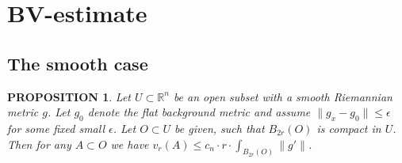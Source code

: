 \documentclass[12pt,leqno,intlimits]{amsart}
\numberwithin{equation}{section}
\newtheorem{prop}[thm]{PROPOSITION}
\theoremstyle{definition}
\newtheorem{defn}[thm]{Definition}%
\theoremstyle{remark}
\newcommand{\R}{\mathbb{R}}
\def\:{\colon}
\begin{document}






\section{BV-estimate}\label{sec-BV-estimate}
\subsection{The smooth case}

\begin{prop}\label{prop-smooth}
Let $U\subset \R^n$ be an open subset with a smooth Riemannian
metric $g$. Let $g_0$ denote the flat background metric and assume $\|g_x-g_0\| \leq \epsilon$ for some fixed small
$\epsilon$.   Let $O\subset U$ be given, such that $B_{2r} (O)$ is compact in $U$.
Then for any $A\subset O$ we have $v_r (A) \leq c_n \cdot r \cdot \int _{B_{2r} ( O)} \|g'\|$.
\end{prop}
\end{document}
